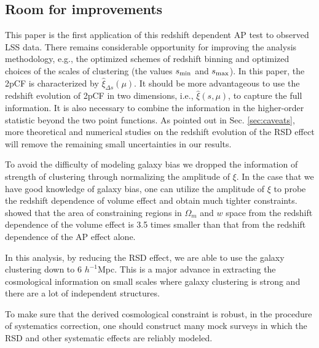 \documentclass[iop]{emulateapj}
\begin{document}


\subsection{Room for improvements}

This paper is the first application of this redshift dependent AP test to observed LSS data.
There remains considerable opportunity for improving the analysis methodology,
e.g., the optimized schemes of redshift binning and 
optimized choices of the scales of clustering (the values $s_{\rm min}$ and $s_{\rm max}$).
In this paper, the 2pCF is characterized by $\hat \xi_{\Delta s}(\mu)$.
It should be more advantageous to use 
the redshift evolution of 2pCF in two dimensions, i.e., $\hat \xi(s,\mu)$, 
to capture the full information.
It is also necessary to combine the 
information in the higher-order
statistic beyond the two point functions.
As pointed out in Sec. \ref{sec:caveats},
more theoretical and numerical studies on the 
redshift evolution of the RSD effect 
will remove the remaining small 
uncertainties in our results.

To avoid the difficulty of modeling galaxy bias we dropped the information of strength of clustering
through normalizing the amplitude of $\xi$.
In the case that we have good knowledge of galaxy bias, one can utilize the amplitude of $\xi$ to probe the redshift dependence of volume effect 
and obtain much tighter constraints.
\cite{Li2015} showed that
the area of constraining regions in $\Omega_m$ and $w$ space from the redshift dependence of the volume effect is 3.5 times smaller 
than that from the redshift dependence of the AP effect alone.

In this analysis, by reducing the RSD effect, 
we are able to use the galaxy clustering down to 6 $h^{-1}$Mpc.
This is a major advance in extracting the cosmological information 
on small scales where galaxy clustering is strong
and there are a lot of independent structures.

To make sure that the derived cosmological constraint is robust, 
in the procedure of systematics correction, 
one should construct many mock surveys in which the RSD and other systematic effects are reliably modeled.
\end{document}
